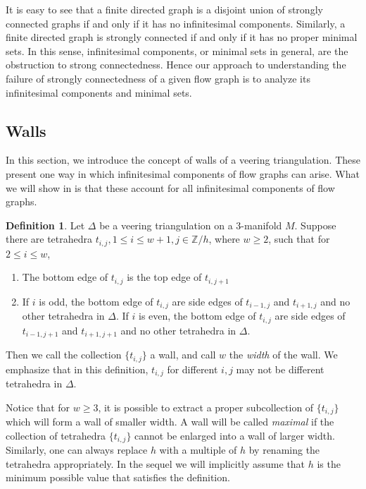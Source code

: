 \documentclass[12pt]{amsart}
\theoremstyle{definition}
\newtheorem{defn}[thm]{Definition}
\numberwithin{equation}{section}
\begin{document}
It is easy to see that a finite directed graph is a disjoint union of strongly connected graphs if and only if it has no infinitesimal components. Similarly, a finite directed graph is strongly connected if and only if it has no proper minimal sets. In this sense, infinitesimal components, or minimal sets in general, are the obstruction to strong connectedness. Hence our approach to understanding the failure of strongly connectedness of a given flow graph is to analyze its infinitesimal components and minimal sets.

\subsection{Walls} \label{subsec:wall}

In this section, we introduce the concept of walls of a veering triangulation. These present one way in which infinitesimal components of flow graphs can arise. What we will show in  is that these account for all infinitesimal components of flow graphs. 

\begin{defn} \label{defn:wall}
Let $\Delta$ be a veering triangulation on a 3-manifold $M$. Suppose there are tetrahedra $t_{i,j}, 1 \leq i \leq w+1, j \in \mathbb{Z}/h$, where $w \geq 2$, such that for $2 \leq i \leq w$,

\begin{enumerate}
    \item The bottom edge of $t_{i,j}$ is the top edge of $t_{i,j+1}$
    \item If $i$ is odd, the bottom edge of $t_{i,j}$ are side edges of $t_{i-1,j}$ and $t_{i+1,j}$ and no other tetrahedra in $\Delta$. If $i$ is even, the bottom edge of $t_{i,j}$ are side edges of $t_{i-1,j+1}$ and $t_{i+1,j+1}$ and no other tetrahedra in $\Delta$.
\end{enumerate}

Then we call the collection $\{t_{i,j}\}$ a wall, and call $w$ the \textit{width} of the wall. We emphasize that in this definition, $t_{i,j}$ for different $i,j$ may not be different tetrahedra in $\Delta$.

Notice that for $w\geq 3$, it is possible to extract a proper subcollection of $\{t_{i,j}\}$ which will form a wall of smaller width. A wall will be called \textit{maximal} if the collection of tetrahedra $\{t_{i,j}\}$ cannot be enlarged into a wall of larger width. Similarly, one can always replace $h$ with a multiple of $h$ by renaming the tetrahedra appropriately. In the sequel we will implicitly assume that $h$ is the minimum possible value that satisfies the definition. 
\end{defn}
\end{document}
